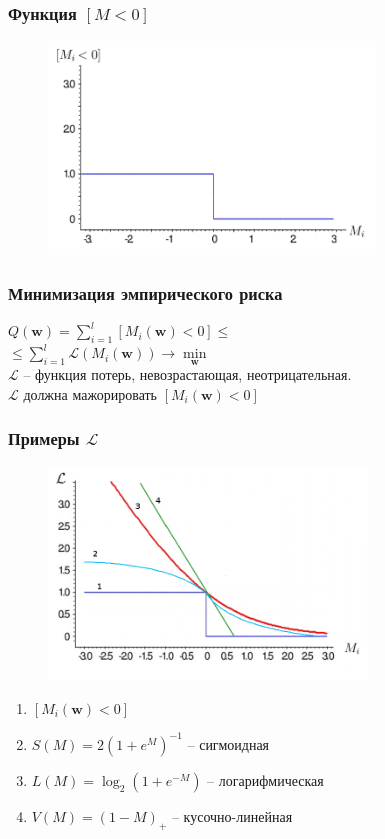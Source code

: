 \documentclass[10pt]{beamer}
\begin{document}
\begin{frame}\frametitle{Функция $[M<0]$}
	\begin{figure}[htbp]
	  \includegraphics[height=160pt, keepaspectratio = true]{images/l1}
	\end{figure}
\end{frame}

\begin{frame}\frametitle{Минимизация эмпирического риска}
	${Q(\mathbf{w}) = \sum\limits_{i=1}^l \left[ M_i(\mathbf{w}) < 0 \right] \leq}$\\ \vspace{3mm}
	\hspace{10mm} ${\leq \sum\limits_{i=1}^l \mathcal{L}(M_i(\mathbf{w})) \rightarrow \min\limits_{\mathbf{w}} }$\\\vspace{3mm}
	$\mathcal{L}$ -- функция потерь, невозрастающая, неотрицательная.\\
	$\mathcal{L}$ должна мажорировать $\left[M_i(\mathbf{w}) < 0 \right]$
\end{frame}

\begin{frame}\frametitle{Примеры $\mathcal{L}$}
	\begin{figure}[htbp]
	  \includegraphics[height=160pt, keepaspectratio = true]{images/l}
	\end{figure}

	\begin{enumerate}
		\item $\left[M_i(\mathbf{w}) < 0 \right]$
		\item $S(M) = 2(1+e^M)^{-1}$ -- сигмоидная
		\item $L(M) = \log_2(1+e^{-M})$ -- логарифмическая
		\item $V(M) = (1-M)_+$ -- кусочно-линейная
	\end{enumerate}
\end{frame}
\end{document}
